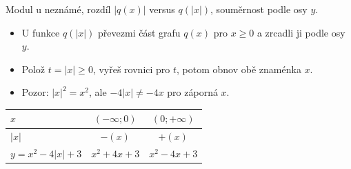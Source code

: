 \documentclass[11pt,a4paper]{article}
\begin{document}
Modul u neznámé, rozdíl $|q(x)|$ versus $q(|x|)$, souměrnost podle osy $y$.
\begin{itemize}
\item U funkce $q(|x|)$ převezmi část grafu $q(x)$ pro $x\ge0$ a zrcadli ji podle osy $y$.
\item Polož $t=|x|\ge0$, vyřeš rovnici pro $t$, potom obnov obě znaménka $x$.
\item Pozor: $|x|^2=x^2$, ale $-4|x|\ne-4x$ pro záporná $x$.
\end{itemize}
\begin{center}\renewcommand{\arraystretch}{1.26}\small
\begin{tabular}{@{}lcc@{}}\toprule
$x$ & $(-\infty;0)$ & $(0;+\infty)$\\\midrule
$|x|$ & $-(x)$ & $+(x)$\\\midrule
$y=x^2-4|x|+3$ & $x^2+4x+3$ & $x^2-4x+3$\\\bottomrule
\end{tabular}
\end{center}
\end{document}
